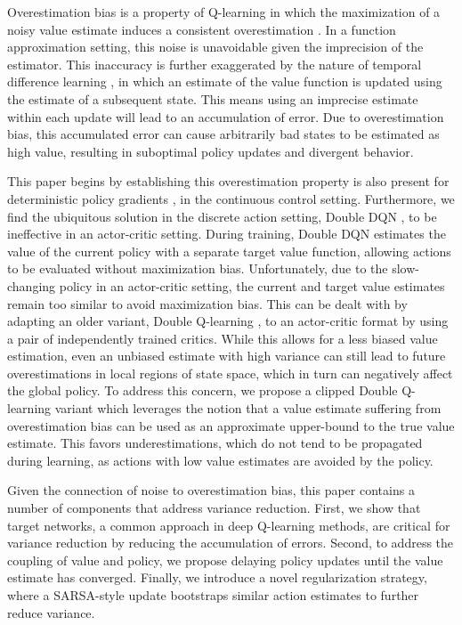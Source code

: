 \documentclass{article}
\begin{document}
Overestimation bias is a property of Q-learning in which the maximization of a noisy value estimate induces a consistent overestimation \cite{thrun1993bias}. In a function approximation setting, this noise is unavoidable given the imprecision of the estimator. This inaccuracy is further exaggerated by the nature of temporal difference learning \cite{sutton1988tdlearning}, in which an estimate of the value function is updated using the estimate of a subsequent state. This means using an imprecise estimate within each update will lead to an accumulation of error.
Due to overestimation bias, this accumulated error can cause arbitrarily bad states to be estimated as high value, resulting in suboptimal policy updates and divergent behavior.

This paper begins by establishing this overestimation property is also present for deterministic policy gradients \cite{DPG}, in the continuous control setting. Furthermore, we find the ubiquitous solution in the discrete action setting, Double DQN \cite{DoubleDQN}, to be ineffective in an actor-critic setting. During training, Double DQN estimates the value of the current policy with a separate target value function, allowing actions to be evaluated without maximization bias. Unfortunately, due to the slow-changing policy in an actor-critic setting, the current and target value estimates remain too similar to avoid maximization bias. This can be dealt with by adapting an older variant, Double Q-learning \cite{hasselt2010double}, to an actor-critic format by using a pair of independently trained critics. While this allows for a less biased value estimation, even an unbiased estimate with high variance can still lead to future overestimations in local regions of state space, which in turn can negatively affect the global policy. To address this concern, we propose a clipped Double Q-learning variant which leverages the notion that a value estimate suffering from overestimation bias can be used as an approximate upper-bound to the true value estimate. This favors underestimations, which do not tend to be propagated during learning, as actions with low value estimates are avoided by the policy.

Given the connection of noise to overestimation bias, this paper contains a number of components that address variance reduction. First, we show that target networks, a common approach in deep Q-learning methods, are critical for variance reduction by reducing the accumulation of errors. Second, to address the coupling of value and policy, we propose delaying policy updates until the value estimate has converged. Finally, we introduce a novel regularization strategy, where a SARSA-style update bootstraps similar action estimates to further reduce variance. 
\end{document}
